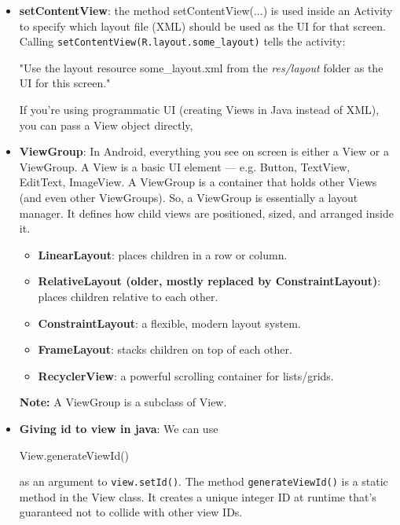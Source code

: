 \documentclass{report}
\begin{document}
\begin{itemize}
\begin{javacode}
            \end{javacode}
        \item \textbf{setContentView}: the method setContentView(...) is used inside an Activity to specify which layout file (XML) should be used as the UI for that screen.
            \bigbreak \noindent 
            Calling \texttt{setContentView(R.layout.some\_layout)} tells the activity:
            \begin{center}
                "Use the layout resource some\_layout.xml from the \textit{res/layout} folder as the UI for this screen."
            \end{center}
            \bigbreak \noindent 
            If you’re using programmatic UI (creating Views in Java instead of XML), you can pass a View object directly,
        \item \textbf{ViewGroup}:
            In Android, everything you see on screen is either a View or a ViewGroup.
            \bigbreak \noindent 
            A View is a basic UI element — e.g. Button, TextView, EditText, ImageView.
            \bigbreak \noindent 
            A ViewGroup is a container that holds other Views (and even other ViewGroups). 
            \bigbreak \noindent 
            So, a ViewGroup is essentially a layout manager. It defines how child views are positioned, sized, and arranged inside it.
            \begin{itemize}
                \item \textbf{LinearLayout}: places children in a row or column.
                \item \textbf{RelativeLayout (older, mostly replaced by ConstraintLayout)}: places children relative to each other.
                \item \textbf{ConstraintLayout}: a flexible, modern layout system.
                \item \textbf{FrameLayout}: stacks children on top of each other.
                \item \textbf{RecyclerView}: a powerful scrolling container for lists/grids.
            \end{itemize}
            \textbf{Note:} A ViewGroup is a subclass of View.
        \item \textbf{Giving id to view in java}: We can use
            \bigbreak \noindent 
            \begin{javacode}
            View.generateViewId()
            \end{javacode}
            as an argument to \texttt{view.setId()}. The method \texttt{generateViewId()} is a static method in the View class. It creates a unique integer ID at runtime that’s guaranteed not to collide with other view IDs.


    \end{itemize}
\end{document}
